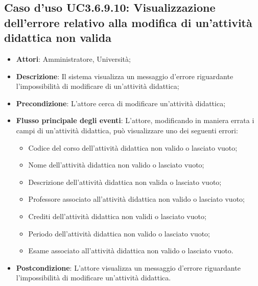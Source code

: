\subsection{Caso d'uso \texorpdfstring{UC3.6.9.10}{UC3.6.9.10}: Visualizzazione dell'errore relativo alla modifica di un’attività didattica non valida}
\begin{itemize}
\item \textbf{Attori}: Amministratore, Università;
\item \textbf{Descrizione}: Il sistema visualizza un messaggio d'errore riguardante l'impossibilità di modificare di un'attività didattica;

\item \textbf{Precondizione}: L'attore cerca di modificare un'attività didattica;

\item \textbf{Flusso principale degli eventi}: L'attore, modificando in maniera errata i campi di un'attività didattica, può visualizzare uno dei seguenti errori: \begin{itemize} 
\item Codice del corso dell’attività didattica non valido o lasciato vuoto; 
\item Nome dell’attività didattica non valido o lasciato vuoto;
\item Descrizione dell’attività didattica non valida o lasciato vuoto; 
\item Professore associato all’attività didattica non valido o lasciato vuoto;
\item Crediti dell’attività didattica non validi o lasciato vuoto; 
\item Periodo dell’attività didattica non valido o lasciato vuoto; 
\item Esame associato all’attività didattica non valido o lasciato vuoto. 
\end{itemize}
\item \textbf{Postcondizione}: L'attore visualizza un messaggio d'errore riguardante l'impossibilità di modificare un'attività didattica.

\end{itemize}

